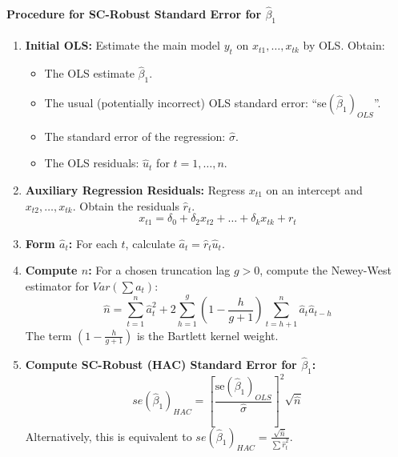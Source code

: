 \documentclass[a4paper, 10pt]{article}
\theoremstyle{definition}	%
\begin{document}
\paragraph{Procedure for SC-Robust Standard Error for \(\hat{\beta}_1\)}
\begin{enumerate}
    \item \textbf{Initial OLS:} Estimate the main model \(y_t\) on \(x_{t1}, \dots, x_{tk}\) by OLS. Obtain:
    \begin{itemize}
        \item The OLS estimate \(\hat{\beta}_1\).
        \item The usual (potentially incorrect) OLS standard error: ``se\((\hat{\beta}_1)_{OLS}\)''.
        \item The standard error of the regression: \(\hat{\sigma}\).
        \item The OLS residuals: \(\hat{u}_t\) for \(t=1, \dots, n\).
    \end{itemize}
    \item \textbf{Auxiliary Regression Residuals:} Regress \(x_{t1}\) on an intercept and \(x_{t2}, \dots, x_{tk}\). Obtain the residuals \(\hat{r}_t\).
    \begin{equation} \label{eq:aux_reg_robust}
    x_{t1} = \delta_0 + \delta_2 x_{t2} + \dots + \delta_k x_{tk} + r_t
    \end{equation}
    \item \textbf{Form \(\hat{a}_t\):} For each \(t\), calculate \(\hat{a}_t = \hat{r}_t \hat{u}_t\).
    \item \textbf{Compute \(\hat{n}\):} For a chosen truncation lag \(g > 0\), compute the Newey-West estimator for \(Var(\sum a_t)\):
    \begin{equation} \label{eq:n_hat_newey_west}
    \hat{n} = \sum_{t=1}^n \hat{a}_t^2 + 2 \sum_{h=1}^g \left(1 - \frac{h}{g+1}\right) \sum_{t=h+1}^n \hat{a}_t \hat{a}_{t-h}
    \end{equation}
    The term \((1 - \frac{h}{g+1})\) is the Bartlett kernel weight.
    \item \textbf{Compute SC-Robust (HAC) Standard Error for \(\hat{\beta}_1\):}
    \begin{equation} \label{eq:se_robust_beta1}
    se(\hat{\beta}_1)_{HAC} = \left[ \frac{\text{se}(\hat{\beta}_1)_{OLS}}{\hat{\sigma}} \right]^2 \sqrt{\hat{n}}
    \end{equation}
    Alternatively, this is equivalent to \( se(\hat{\beta}_1)_{HAC} = \frac{\sqrt{\hat{n}}}{\sum \hat{r}_t^2} \).
\end{enumerate}
\end{document}
